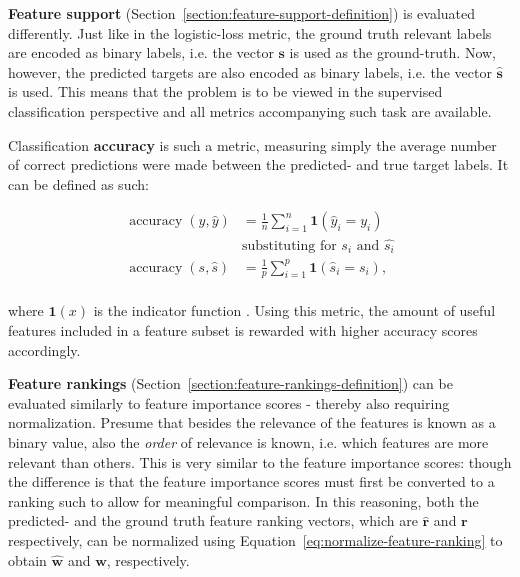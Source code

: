 \documentclass{article}
\begin{document}
\textbf{Feature support} (Section~\ref{section:feature-support-definition}) is evaluated differently. Just like in the logistic-loss metric, the ground truth relevant labels are encoded as binary labels, i.e. the vector $\boldsymbol{s}$ is used as the ground-truth. Now, however, the predicted targets are also encoded as binary labels, i.e. the vector $\hat{\boldsymbol{s}}$ is used. This means that the problem is to be viewed in the supervised classification perspective and all metrics accompanying such task are available.

Classification \textbf{accuracy} is such a metric, measuring simply the average number of correct predictions were made between the predicted- and true target labels. It can be defined as such:

\begin{equation}
\begin{aligned}
\operatorname{accuracy}(y, \hat{y}) &= \frac{1}{n} \sum_{i=1}^{n} \boldsymbol{1} \left(\hat{y}_{i}=y_{i}\right) \\
&\text{substituting for } s_i \text{ and } \hat{s_i}\\
\operatorname{accuracy}(s, \hat{s}) &= \frac{1}{p} \sum_{i=1}^{p} \boldsymbol{1} \left(\hat{s}_{i}=s_{i}\right), \\
\end{aligned}
\end{equation}

where $\boldsymbol{1}(x)$ is the indicator function \citep{davis_undecidable_2004}. Using this metric, the amount of useful features included in a feature subset is rewarded with higher accuracy scores accordingly.

\textbf{Feature rankings} (Section~\ref{section:feature-rankings-definition}) can be evaluated similarly to feature importance scores - thereby also requiring normalization. Presume that besides the relevance of the features is known as a binary value, also the \textit{order} of relevance is known, i.e. which features are more relevant than others. This is very similar to the feature importance scores: though the difference is that the feature importance scores must first be converted to a ranking such to allow for meaningful comparison. In this reasoning, both the predicted- and the ground truth feature ranking vectors, which are $\hat{\boldsymbol{r}}$ and $\boldsymbol{r}$ respectively, can be normalized using Equation~\ref{eq:normalize-feature-ranking} to obtain $\hat{\boldsymbol{w}}$ and $\boldsymbol{w}$, respectively.
\end{document}
